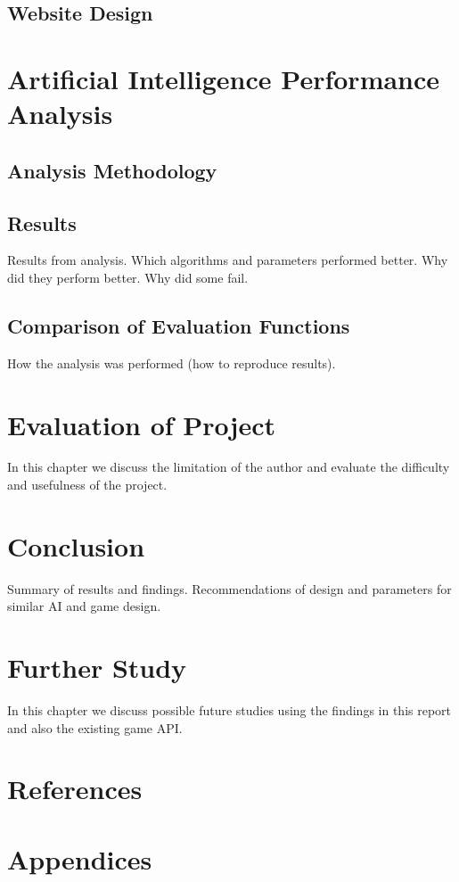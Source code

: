 \documentclass{bhamthesis}
\theoremstyle{definition}
\begin{document}
\section{Website Design}\label{s:website}


\chapter{Artificial Intelligence Performance Analysis}
\section{Analysis Methodology}
\section{Results}
Results from analysis. \cite{Browne2012}
Which algorithms and parameters performed better.
Why did they perform better.
Why did some fail.
\section{Comparison of Evaluation Functions}
How the analysis was performed (how to reproduce results).


\chapter{Evaluation of Project}
In this chapter we discuss the limitation of the author and evaluate the difficulty and usefulness of the project.

\chapter{Conclusion}
Summary of results and findings. Recommendations of design and parameters for similar AI and game design.

\chapter{Further Study}
In this chapter we discuss possible future studies using the findings in this report and also the existing game API.



\backmatter
\chapter{References}
\printbibliography[heading=none]
%
%

\chapter{Appendices}
\end{document}
